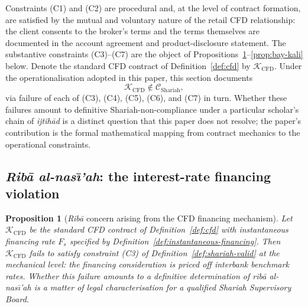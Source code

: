 \documentclass[preprint,12pt,authoryear]{elsarticle}
\newcommand{\CC}{\mathcal{C}}
\newtheorem{proposition}{Proposition}[section]
\theoremstyle{definition}
\begin{document}
Constraints (C1) and (C2) are procedural and, at the level of
contract formation, are satisfied by the mutual and voluntary
nature of the retail CFD relationship: the client consents to the
broker's terms and the terms themselves are documented in the
account agreement and product-disclosure statement. The substantive
constraints (C3)--(C7) are the object of
Propositions~\ref{prop:riba}--\ref{prop:bay-kali} below. Denote the
standard CFD contract of Definition~\ref{def:cfd} by
$\mathcal{K}_{\text{CFD}}$. Under the operationalisation adopted
in this paper, this section documents
\begin{equation}
    \mathcal{K}_{\text{CFD}} \notin \CC_{\text{Shariah}},
    \label{eq:cfd-not-shariah}
\end{equation}
via failure of each of (C3), (C4), (C5), (C6), and (C7) in turn.
Whether these failures amount to definitive Shariah-non-compliance
under a particular scholar's chain of \emph{ijtih\={a}d} is a
distinct question that this paper does not resolve; the paper's
contribution is the formal mathematical mapping from contract
mechanics to the operational constraints.

\subsection{\emph{Rib\={a} al-nas\={\i}'ah}: the interest-rate
    financing violation}
\label{sec:riba-analysis}

\begin{proposition}[\emph{Rib\={a}} concern arising from the CFD
    financing mechanism]
\label{prop:riba}
Let $\mathcal{K}_{\text{CFD}}$ be the standard CFD contract of
Definition~\ref{def:cfd} with instantaneous financing rate $F_s$
specified by Definition~\ref{def:instantaneous-financing}. Then
$\mathcal{K}_{\text{CFD}}$ fails to satisfy constraint (C3) of
Definition~\ref{def:shariah-valid} at the mechanical level: the
financing consideration is priced off interbank benchmark rates.
Whether this failure amounts to a definitive determination of
\emph{rib\={a} al-nas\={\i}'ah} is a matter of legal
characterisation for a qualified Shariah Supervisory Board.
\end{proposition}
\end{document}
